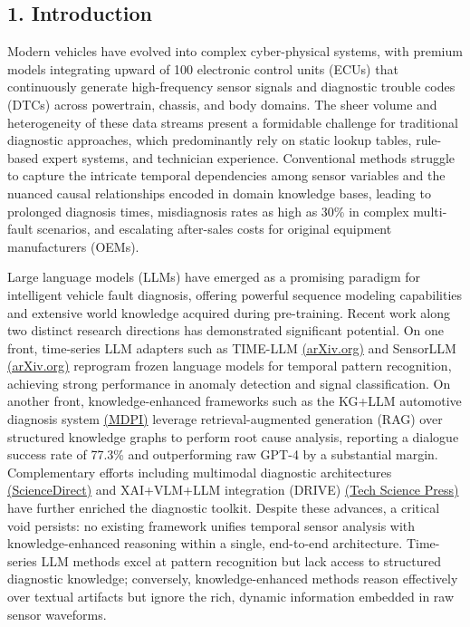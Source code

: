 \documentclass[
  11pt,
]{article}
\begin{document}
\newpage

\subsection{1. Introduction}\label{introduction}

Modern vehicles have evolved into complex cyber-physical systems, with
premium models integrating upward of 100 electronic control units (ECUs)
that continuously generate high-frequency sensor signals and diagnostic
trouble codes (DTCs) across powertrain, chassis, and body domains. The
sheer volume and heterogeneity of these data streams present a
formidable challenge for traditional diagnostic approaches, which
predominantly rely on static lookup tables, rule-based expert systems,
and technician experience. Conventional methods struggle to capture the
intricate temporal dependencies among sensor variables and the nuanced
causal relationships encoded in domain knowledge bases, leading to
prolonged diagnosis times, misdiagnosis rates as high as 30\% in complex
multi-fault scenarios, and escalating after-sales costs for original
equipment manufacturers (OEMs).

Large language models (LLMs) have emerged as a promising paradigm for
intelligent vehicle fault diagnosis, offering powerful sequence modeling
capabilities and extensive world knowledge acquired during pre-training.
Recent work along two distinct research directions has demonstrated
significant potential. On one front, time-series LLM adapters such as
TIME-LLM \href{https://arxiv.org/html/2310.01728v1}{(arXiv.org)} and
SensorLLM \href{https://arxiv.org/abs/2410.10624}{(arXiv.org)} reprogram
frozen language models for temporal pattern recognition, achieving
strong performance in anomaly detection and signal classification. On
another front, knowledge-enhanced frameworks such as the KG+LLM
automotive diagnosis system
\href{https://www.mdpi.com/2079-9292/14/21/4180}{(MDPI)} leverage
retrieval-augmented generation (RAG) over structured knowledge graphs to
perform root cause analysis, reporting a dialogue success rate of 77.3\%
and outperforming raw GPT-4 by a substantial margin. Complementary
efforts including multimodal diagnostic architectures
\href{https://www.sciencedirect.com/science/article/abs/pii/S0957417424014702}{(ScienceDirect)}
and XAI+VLM+LLM integration (DRIVE)
\href{https://www.techscience.com/CMES/online/detail/26431}{(Tech
Science Press)} have further enriched the diagnostic toolkit. Despite
these advances, a critical void persists: no existing framework unifies
temporal sensor analysis with knowledge-enhanced reasoning within a
single, end-to-end architecture. Time-series LLM methods excel at
pattern recognition but lack access to structured diagnostic knowledge;
conversely, knowledge-enhanced methods reason effectively over textual
artifacts but ignore the rich, dynamic information embedded in raw
sensor waveforms.
\end{document}
